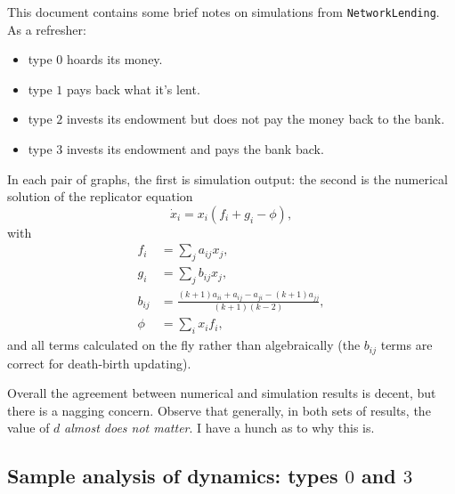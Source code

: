 \documentclass[13pt]{amsart}
\begin{document}
This document contains some brief notes on simulations from \texttt{NetworkLending}.
As a refresher:
\begin{itemize}
    \item type $0$ hoards its money.
    \item type $1$ pays back what it's lent.
    \item type $2$ invests its endowment but does not pay the money back to the bank.
    \item type $3$ invests its endowment and pays the bank back.
\end{itemize}
In each pair of graphs, the first is simulation output: the second is the numerical solution of the replicator equation
\begin{equation}
    \dot{x}_i = x_i (f_i + g_i - \phi),
\end{equation}
with
\begin{equation}
    \begin{split}
        f_i & = \sum_j a_{ij} x_j,\\
        g_i & = \sum_j b_{ij} x_j,\\
        b_{ij} & = \frac{(k+1)a_{ii} + a_{ij} - a_{ji} - (k+1)a_{jj}}{(k+1)(k-2)},\\
        \phi & = \sum_i x_i f_i,
    \end{split}
\end{equation}
and all terms calculated on the fly rather than algebraically (the $b_{ij}$ terms are correct for death-birth updating).

Overall the agreement between numerical and simulation results is decent, but there is a nagging concern.
Observe that generally, in both sets of results, the value of $d$ \emph{almost does not matter}.
I have a hunch as to why this is.

\subsection*{Sample analysis of dynamics: types $0$ and $3$}
\end{document}
